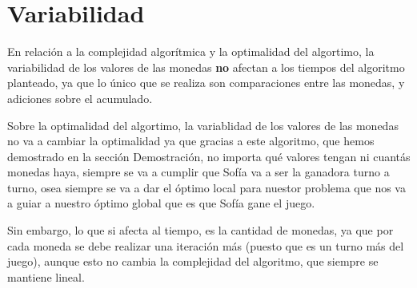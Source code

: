 \section{Variabilidad}

 En relación a la complejidad algorítmica y la optimalidad del algortimo, la variabilidad de los valores de las monedas \textbf{no} afectan a los tiempos del algoritmo planteado, ya que lo único que se realiza son comparaciones entre las monedas, y adiciones sobre el acumulado.

 Sobre la optimalidad del algortimo, la variablidad de los valores de las monedas no va a cambiar la optimalidad ya que gracias a este algoritmo, que hemos demostrado en la sección Demostración, no importa qué valores tengan ni cuantás monedas haya, siempre se va a cumplir que Sofía va a ser la ganadora turno a turno, osea siempre se va a dar el óptimo local para nuestor problema que nos va a guiar a nuestro óptimo global que es que Sofía gane el juego.

 Sin embargo, lo que si afecta al tiempo, es la cantidad de monedas, ya que por cada moneda se debe realizar una iteración más (puesto que es un turno más del juego), aunque esto no cambia la complejidad del algoritmo, que siempre se mantiene lineal.



